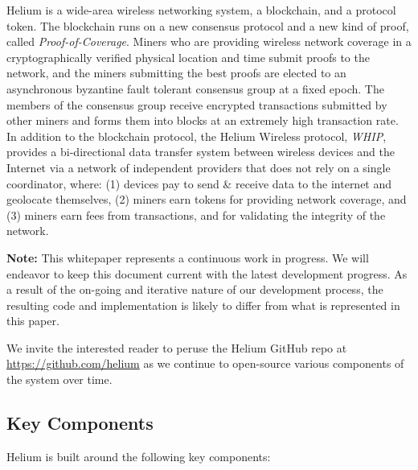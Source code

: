 \documentclass[10pt, nonatbib, nocopyrightspace, reprint]{sigplanconf}
\begin{document}
Helium is a wide-area wireless networking system, a blockchain, and a protocol token. The blockchain runs on a new consensus protocol and a new kind of proof, called \emph{Proof-of-Coverage}. Miners who are providing wireless network coverage in a cryptographically verified physical location and time submit proofs to the network, and the miners submitting the best proofs are elected to an asynchronous byzantine fault tolerant consensus group at a fixed epoch. The members of the consensus group receive encrypted transactions submitted by other miners and forms them into blocks at an extremely high transaction rate. In addition to the blockchain protocol, the Helium Wireless protocol, \emph{WHIP}, provides a bi-directional data transfer system between wireless devices and the Internet via a network of independent providers that does not rely on a single coordinator, where: (1) devices pay to send \& receive data to the internet and geolocate themselves, (2) miners earn tokens for providing network coverage, and (3) miners earn fees from transactions, and for validating the integrity of the network.

\textbf{Note:} This whitepaper represents a continuous work in progress. We will endeavor to keep this document current with the latest development progress. As a result of the on-going and iterative nature of our development process, the resulting code and implementation is likely to differ from what is represented in this paper.

We invite the interested reader to peruse the Helium GitHub repo at \url{https://github.com/helium} as we continue to open-source various components of the system over time.

\subsection{Key Components}

Helium is built around the following key components:
\end{document}

